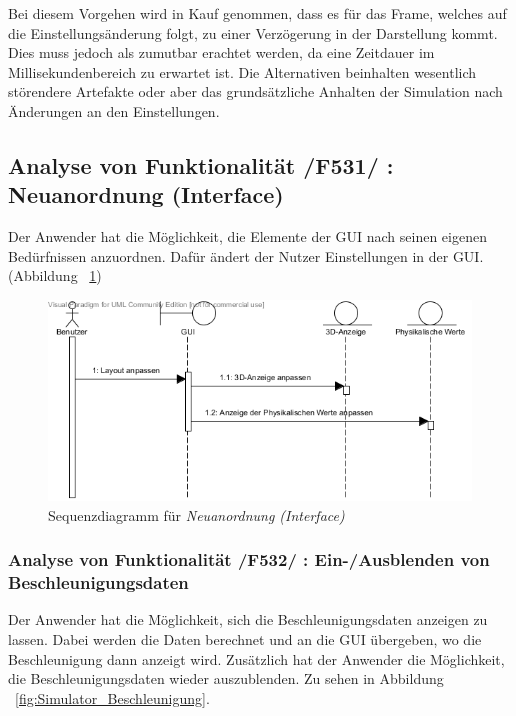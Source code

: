 Bei diesem Vorgehen wird in Kauf genommen, dass es für das Frame, welches auf die Einstellungsänderung folgt, zu einer Verzögerung in der Darstellung kommt. Dies muss jedoch als zumutbar erachtet werden, da eine Zeitdauer im Millisekundenbereich zu erwartet ist. Die Alternativen beinhalten wesentlich störendere Artefakte oder aber das grundsätzliche Anhalten der Simulation nach Änderungen an den Einstellungen.

\subsection{Analyse von Funktionalität /F531/ :   Neuanordnung (Interface)}
Der Anwender hat die Möglichkeit, die Elemente der GUI nach seinen eigenen Bedürfnissen anzuordnen. Dafür ändert der Nutzer Einstellungen in der GUI. (Abbildung ~\ref{fig:Interface_Neuanordnung})

\begin{figure}[h!]
\includegraphics[width=\linewidth]{bilder/Interface_Neuanordnung}
\caption{Sequenzdiagramm für \textit{Neuanordnung (Interface)}}
\label{fig:Interface_Neuanordnung}
\end{figure}
\subsubsection{Analyse von Funktionalität /F532/ :  Ein-/Ausblenden von Beschleunigungsdaten}
Der Anwender hat die Möglichkeit, sich die Beschleunigungsdaten anzeigen zu lassen. Dabei werden die Daten berechnet und an die GUI übergeben, wo die Beschleunigung dann anzeigt wird. Zusätzlich hat der Anwender die Möglichkeit, die Beschleunigungsdaten wieder auszublenden. Zu sehen in Abbildung ~\ref{fig:Simulator_Beschleunigung}.

